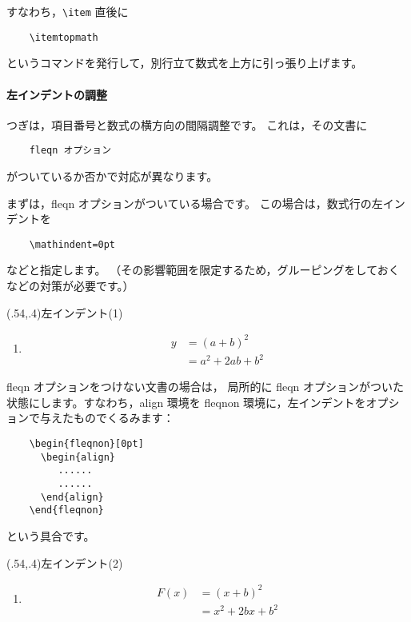 \documentclass[fleqn,a4j]{jarticle}
\begin{document}
すなわち，\verb+\item+ 直後に
\begin{verbatim}
    \itemtopmath
\end{verbatim}
というコマンドを発行して，別行立て数式を上方に引っ張り上げます。

\paragraph{左インデントの調整}
  つぎは，項目番号と数式の横方向の間隔調整です。
これは，その文書に
\begin{verbatim}
    fleqn オプション
\end{verbatim}
がついているか否かで対応が異なります。

  まずは，fleqn オプションがついている場合です。
この場合は，数式行の左インデントを
\begin{verbatim}
    \mathindent=0pt
\end{verbatim}
などと指定します。
（その影響範囲を限定するため，グルーピングをしておくなどの対策が必要です。）
\bigskip

\begin{showEx}(.54,.4){左インデント(1)}
\begin{enumerate}[(1)]
  \item \itemtopmath
    \mathindent=0pt\relax
    \begin{align*}
      y&=(a+b)^2\\
       &=a^2+2ab+b^2
    \end{align*}
\end{enumerate}
\end{showEx}

  fleqn オプションをつけない文書の場合は，
局所的に fleqn オプションがついた状態にします。すなわち，align 環境を
fleqnon 環境に，左インデントをオプションで与えたものでくるみます：

\begin{verbatim}
    \begin{fleqnon}[0pt]
      \begin{align}
         ......
         ......
      \end{align}
    \end{fleqnon}
\end{verbatim}
という具合です。

\begin{showEx}(.54,.4){左インデント(2)}
\begin{enumerate}[(1)]
\item \itemtopmath
\begin{fleqnon}[0pt]
\begin{align*}
F(x)&=(x+b)^2\\
  &=x^2+2bx+b^2
\end{align*}
\end{fleqnon}
\end{enumerate}
\end{showEx}
\end{document}
